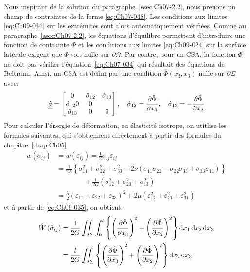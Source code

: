 Nous inspirant de la solution du paragraphe~\ref{ssec:Ch07-2.2}, nous prenons un champ de contraintes de la forme \eqref{eq:Ch07-048}.
Les conditions aux limites \eqref{eq:Ch09-034} sur les extrémités sont alors automatiquement vérifiées.
Comme au paragraphe~\ref{ssec:Ch07-2.2}, les équations d'équilibre permettent d'introduire une fonction de contrainte $\Phi$ et les conditions aux limites \eqref{eq:Ch09-024} sur la surface latérale exigent que $\Phi$ soit nulle sur $\partial \Omega$.
Par contre, pour un CSA, la fonction $\Phi$ ne doit pas vérifier l'êquation~\eqref{eq:Ch07-034} qui résultait des équations de Beltrami.
Ainsi, un CSA est défini par une condition $\hat{\Phi} (x_2, x_3)$ nulle sur $\partial \Sigma$ avec:
\begin{equation}
    \hat{\underline{\underline{\sigma}}} = 
    \begin{bmatrix}
        0 & \hat{\sigma}_{12} & \hat{\sigma}_{13} \\
        \hat{\sigma}_{12} 0 & 0 \\
        \hat{\sigma}_{13} & 0 & 0
    \end{bmatrix}
    , \quad \hat{\sigma}_{12} = \frac{\partial \hat{\Phi}}{\partial x_3},\quad \hat{\sigma}_{13} = - \frac{\partial \hat{\Phi}}{\partial x_2}
    \label{eq:Ch09-035}
\end{equation}
Pour calculer l'énergie de déformation, en élasticité isotrope, on utitlise les formules suivantes, qui s'obtiennent directement à partir des formules du chapitre~\ref{chap:Ch05}
\begin{align}
    w(\sigma_{ij}) &= w (\varepsilon_{ij}) = \frac{1}{2} \sigma_{ij} \varepsilon_{ij} \\
    &= \frac{1}{2E} \left\{ \sigma_{11}^2 + \sigma_{22}^2 + \sigma_{33}^2 - 2 \nu \left( \sigma_{11} \sigma_{22} - \sigma_{22} \sigma_{33} + \sigma_{33}\sigma_{11} \right) \right\}\nonumber\\&\qquad\qquad + \frac{1}{2G} \left( \sigma_{12}^2 + \sigma_{23}^2 + \sigma_{13}^2 \right) \\
    &= \frac{\lambda}{2} \left( \varepsilon_{11} + \varepsilon_{22} + \varepsilon_{33} \right)^2 + 2\mu \left( \varepsilon_{12}^2 + \varepsilon_{23}^2 + \varepsilon_{31}^2 \right)
    \label{eq:Ch09-036}
\end{align}
et à partir de \eqref{eq:Ch09-035}, on obtient: 
\begin{align}
    \hat{W}\left( \hat{\sigma}_{ij} \right) &= \frac{1}{2G} \iint_{\Sigma} \int_0^l \left\{ \left( \frac{\partial \hat{\Phi}}{\partial x_3} \right)^2 + \left( \frac{\partial \hat{\Phi}}{\partial x_2} \right)^2 \right\} \mathop{\mathrm{{}d}}\mathopen{} x_1 \mathop{\mathrm{{}d}}\mathopen{} x_2 \mathop{\mathrm{{}d}}\mathopen{} x_3 \\
    &= \frac{l}{2G} \iint_{\Sigma} \left\{ \left( \frac{\partial \hat{\Phi}}{\partial x_3} \right)^2 + \left( \frac{\partial \hat{\Phi}}{\partial x_2} \right)^2 \right\} \mathop{\mathrm{{}d}}\mathopen{} x_2 \mathop{\mathrm{{}d}}\mathopen{} x_3
    \label{eq:Ch09-037}
\end{align}
